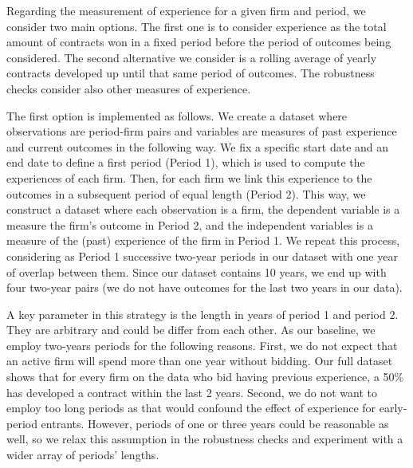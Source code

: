 
Regarding the measurement of experience for a given firm and period, we consider two main options. The first one is to consider experience as the total amount of contracts won in a fixed period before the period of outcomes being considered. The second alternative we consider is a rolling average of yearly contracts developed up until that same period of outcomes. The robustness checks consider also other measures of experience.

The first option is implemented as follows. We create a dataset where observations are period-firm pairs and variables are measures of past experience and current outcomes in the following way. We fix a specific start date and an end date to define a first period (Period 1), which is used to compute the experiences of each firm. Then, for each firm we link this experience to the outcomes in a subsequent period of equal length (Period 2).  This way, we construct a dataset where each observation is a firm, the dependent variable is a measure the firm’s outcome in Period 2, and the independent variables is a measure of the (past) experience of the firm in Period 1. We repeat this process, considering as Period 1 successive two-year periods in our dataset with one year of overlap between them. Since our dataset contains 10 years, we end up with four two-year pairs (we do not have outcomes for the last two years in our data).

A key parameter in this strategy is the length in years of period 1 and period 2. They are arbitrary and could be differ from each other. As our baseline, we employ two-years periods for the following reasons. First, we do not expect that an active firm will spend more than one year without bidding. Our full dataset shows that for every firm on the data who bid having previous experience, a 50\% has developed a contract within the last 2 years. Second, we do not want to employ too long periods as that would confound the effect of experience for early-period entrants. However, periods of one or three years could be reasonable as well, so we relax this assumption in the robustness checks and experiment with a wider array of periods’ lengths.

